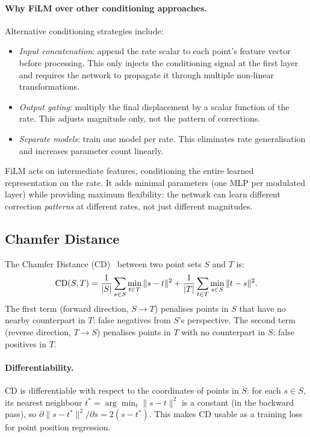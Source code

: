\paragraph{Why FiLM over other conditioning approaches.}
Alternative conditioning strategies include:
\begin{itemize}
  \item \textit{Input concatenation}: append the rate scalar to each point's
    feature vector before processing.
    This only injects the conditioning signal at the first layer and requires
    the network to propagate it through multiple non-linear transformations.
  \item \textit{Output gating}: multiply the final displacement by a scalar
    function of the rate.
    This adjusts magnitude only, not the pattern of corrections.
  \item \textit{Separate models}: train one model per rate.
    This eliminates rate generalisation and increases parameter count linearly.
\end{itemize}
FiLM acts on intermediate features, conditioning the entire learned
representation on the rate. It adds minimal parameters (one MLP per modulated
layer) while providing maximum flexibility: the network can learn different
correction \emph{patterns} at different rates, not just different
magnitudes.

\subsection{Chamfer Distance}
\label{ssec:chamfer}

The Chamfer Distance (CD)~\cite{fan2017pointset} between two point sets $S$ and $T$ is:
\begin{equation}
  \mathrm{CD}(S, T) = \frac{1}{|S|}\sum_{s \in S} \min_{t \in T} \|s - t\|^2
            + \frac{1}{|T|}\sum_{t \in T} \min_{s \in S} \|t - s\|^2.
\end{equation}
The first term (forward direction, $S \to T$) penalises points in $S$ that
have no nearby counterpart in $T$: false negatives from $S$'s perspective.
The second term (reverse direction, $T \to S$) penalises points in $T$ with
no counterpart in $S$: false positives in $T$.

\paragraph{Differentiability.}
CD is differentiable with respect to the coordinates of points in $S$:
for each $s \in S$, its nearest neighbour $t^* = \arg\min_t \|s-t\|^2$ is
a constant (in the backward pass), so $\partial \|s - t^*\|^2 / \partial s = 2(s - t^*)$.
This makes CD usable as a training loss for point position regression.

